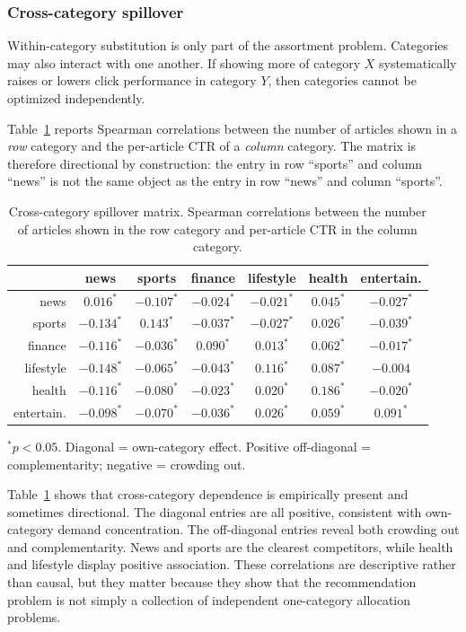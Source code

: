 \documentclass[11pt]{article}
\begin{document}
\subsubsection{Cross-category spillover}

Within-category substitution is only part of the assortment problem. Categories may also interact with one another. If showing more of category $X$ systematically raises or lowers click performance in category $Y$, then categories cannot be optimized independently.

Table~\ref{tab:spillover} reports Spearman correlations between the number of articles shown in a \emph{row} category and the per-article CTR of a \emph{column} category. The matrix is therefore directional by construction: the entry in row ``sports'' and column ``news'' is not the same object as the entry in row ``news'' and column ``sports''.

\begin{table}[ht]
\centering
\caption{Cross-category spillover matrix. Spearman correlations between the number of articles shown in the row category and per-article CTR in the column category.}
\label{tab:spillover}
\small
\begin{tabular}{r|cccccc}
\toprule
& news & sports & finance & lifestyle & health & entertain. \\
\midrule
news & $0.016^*$ & $-0.107^*$ & $-0.024^*$ & $-0.021^*$ & $0.045^*$ & $-0.027^*$ \\
sports & $-0.134^*$ & $0.143^*$ & $-0.037^*$ & $-0.027^*$ & $0.026^*$ & $-0.039^*$ \\
finance & $-0.116^*$ & $-0.036^*$ & $0.090^*$ & $0.013^*$ & $0.062^*$ & $-0.017^*$ \\
lifestyle & $-0.148^*$ & $-0.065^*$ & $-0.043^*$ & $0.116^*$ & $0.087^*$ & $-0.004$ \\
health & $-0.116^*$ & $-0.080^*$ & $-0.023^*$ & $0.020^*$ & $0.186^*$ & $-0.020^*$ \\
entertain. & $-0.098^*$ & $-0.070^*$ & $-0.036^*$ & $0.026^*$ & $0.059^*$ & $0.091^*$ \\
\bottomrule
\end{tabular}

{\footnotesize $^*p < 0.05$. Diagonal = own-category effect. Positive off-diagonal = complementarity; negative = crowding out.}
\end{table}
\FloatBarrier

Table~\ref{tab:spillover} shows that cross-category dependence is empirically present and sometimes directional. The diagonal entries are all positive, consistent with own-category demand concentration. The off-diagonal entries reveal both crowding out and complementarity. News and sports are the clearest competitors, while health and lifestyle display positive association. These correlations are descriptive rather than causal, but they matter because they show that the recommendation problem is not simply a collection of independent one-category allocation problems.
\end{document}
